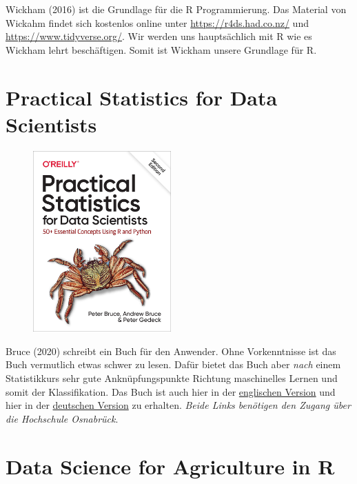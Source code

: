 \documentclass[
  letterpaper,
  DIV=11,
  oneside]{scrreport}
\begin{document}
Wickham (2016) ist die Grundlage für die R Programmierung. Das Material
von Wickahm findet sich kostenlos online unter
\url{https://r4ds.had.co.nz/} und \url{https://www.tidyverse.org/}. Wir
werden uns hauptsächlich mit R wie es Wickham lehrt beschäftigen. Somit
ist Wickham unsere Grundlage für R.

\hypertarget{practical-statistics-for-data-scientists}{%
\section{Practical Statistics for Data
Scientists}\label{practical-statistics-for-data-scientists}}

\begin{figure}

{\centering \includegraphics[width=2.08333in,height=\textheight]{./images/practical.jpg}

}

\end{figure}

Bruce (2020) schreibt ein Buch für den Anwender. Ohne Vorkenntnisse ist
das Buch vermutlich etwas schwer zu lesen. Dafür bietet das Buch aber
\emph{nach} einem Statistikkurs sehr gute Anknüpfungspunkte Richtung
maschinelles Lernen und somit der Klassifikation. Das Buch ist auch hier
in der
\href{https://ebookcentral.proquest.com/lib/hs-osnabrueck/detail.action?docID=6173908}{englischen
Version} und hier in der
\href{http://www.content-select.com/index.php?id=bib_view\&ean=9783960104674}{deutschen
Version} zu erhalten. \emph{Beide Links benötigen den Zugang über die
Hochschule Osnabrück}.

\hypertarget{data-science-for-agriculture-in-r}{%
\section{Data Science for Agriculture in
R}\label{data-science-for-agriculture-in-r}}
\end{document}
